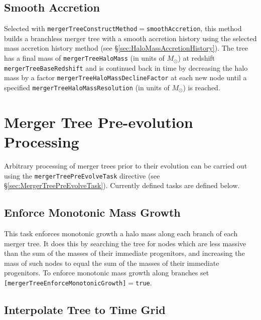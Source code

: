 \subsection{Smooth Accretion}\label{sec:SmoothAccretion}

Selected with {\tt mergerTreeConstructMethod}$=${\tt smoothAccretion}, this method builds a branchless merger tree with a smooth accretion history using the selected mass accretion history method (see \S\ref{sec:HaloMassAccretionHistory}). The tree has a final mass of {\tt mergerTreeHaloMass} (in units of $M_\odot$) at redshift {\tt mergerTreeBaseRedshift} and is continued back in time by decreasing the halo mass by a factor {\tt mergerTreeHaloMassDeclineFactor} at each new \gls{node} until a specified {\tt mergerTreeHaloMassResolution} (in units of $M_\odot$) is reached.

\section{Merger Tree Pre-evolution Processing}

Arbitrary processing of merger trees prior to their evolution can be carried out using the {\tt mergerTreePreEvolveTask} directive (see \S\ref{sec:MergerTreePreEvolveTask}). Currently defined tasks are defined below.

\subsection{Enforce Monotonic Mass Growth}

This task enforces monotonic growth a halo mass along each branch of each merger tree. It does this by searching the tree for nodes which are less massive than the sum of the masses of their immediate progenitors, and increasing the mass of such nodes to equal the sum of the masses of their immediate progenitors. To enforce monotonic mass growth along branches set {\tt [mergerTreeEnforceMonotonicGrowth]}$=${\tt true}.

\subsection{Interpolate Tree to Time Grid}

